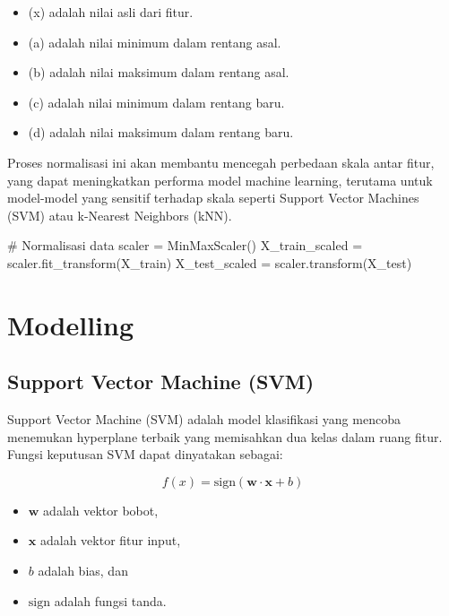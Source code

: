 \documentclass[
  letterpaper,
]{krantz}
\makeatletter
\newenvironment{Shaded}{\begin{snugshade}}{\end{snugshade}}
\newcommand{\CommentTok}[1]{\textcolor[rgb]{0.37,0.37,0.37}{#1}}
\newcommand{\NormalTok}[1]{\textcolor[rgb]{0.00,0.23,0.31}{#1}}
\newcommand{\OperatorTok}[1]{\textcolor[rgb]{0.37,0.37,0.37}{#1}}
\providecommand{\tightlist}{%
  \setlength{\itemsep}{0pt}\setlength{\parskip}{0pt}}\usepackage{longtable,booktabs,array}
\newenvironment{kframe}{%
\medskip{}
\setlength{\fboxsep}{.8em}
 \def\at@end@of@kframe{}%
 \ifinner\ifhmode%
  \def\at@end@of@kframe{\end{minipage}}%
  \begin{minipage}{\columnwidth}%
 \fi\fi%
 \def\FrameCommand##1{\hskip\@totalleftmargin \hskip-\fboxsep
 \colorbox{shadecolor}{##1}\hskip-\fboxsep
     \hskip-\linewidth \hskip-\@totalleftmargin \hskip\columnwidth}%
 \MakeFramed {\advance\hsize-\width
   \@totalleftmargin\z@ \linewidth\hsize
   \@setminipage}}%
 {\par\unskip\endMakeFramed%
 \at@end@of@kframe}
\renewenvironment{Shaded}{\begin{kframe}}{\end{kframe}}
\makeatother
\begin{document}
\begin{itemize}
\tightlist
\item
  (x) adalah nilai asli dari fitur.
\item
  (a) adalah nilai minimum dalam rentang asal.
\item
  (b) adalah nilai maksimum dalam rentang asal.
\item
  (c) adalah nilai minimum dalam rentang baru.
\item
  (d) adalah nilai maksimum dalam rentang baru.
\end{itemize}

Proses normalisasi ini akan membantu mencegah perbedaan skala antar
fitur, yang dapat meningkatkan performa model machine learning, terutama
untuk model-model yang sensitif terhadap skala seperti Support Vector
Machines (SVM) atau k-Nearest Neighbors (kNN).

\begin{Shaded}
\begin{Highlighting}[]
\CommentTok{\# Normalisasi data}
\NormalTok{scaler }\OperatorTok{=}\NormalTok{ MinMaxScaler()}
\NormalTok{X\_train\_scaled }\OperatorTok{=}\NormalTok{ scaler.fit\_transform(X\_train)}
\NormalTok{X\_test\_scaled }\OperatorTok{=}\NormalTok{ scaler.transform(X\_test)}
\end{Highlighting}
\end{Shaded}

\hypertarget{modelling}{%
\section{Modelling}\label{modelling}}

\hypertarget{support-vector-machine-svm}{%
\subsection{Support Vector Machine
(SVM)}\label{support-vector-machine-svm}}

Support Vector Machine (SVM) adalah model klasifikasi yang mencoba
menemukan hyperplane terbaik yang memisahkan dua kelas dalam ruang
fitur. Fungsi keputusan SVM dapat dinyatakan sebagai:

\[
f(x) = \text{sign}(\mathbf{w} \cdot \mathbf{x} + b)
\]

\begin{itemize}
\tightlist
\item
  \(\mathbf{w}\) adalah vektor bobot,
\item
  \(\mathbf{x}\) adalah vektor fitur input,
\item
  \(b\) adalah bias, dan
\item
  \(\text{sign}\) adalah fungsi tanda.
\end{itemize}
\end{document}
